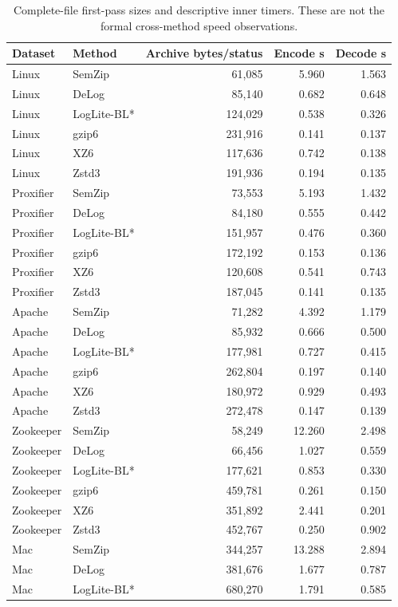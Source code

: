 \begin{longtable}{llrrr}
\caption{Complete-file first-pass sizes and descriptive inner timers. These are not the formal cross-method speed observations.}\\
\toprule
Dataset & Method & Archive bytes/status & Encode s & Decode s \\ \midrule\endhead
Linux & SemZip & 61,085 & 5.960 & 1.563 \\
Linux & DeLog & 85,140 & 0.682 & 0.648 \\
Linux & LogLite-BL* & 124,029 & 0.538 & 0.326 \\
Linux & gzip6 & 231,916 & 0.141 & 0.137 \\
Linux & XZ6 & 117,636 & 0.742 & 0.138 \\
Linux & Zstd3 & 191,936 & 0.194 & 0.135 \\
Proxifier & SemZip & 73,553 & 5.193 & 1.432 \\
Proxifier & DeLog & 84,180 & 0.555 & 0.442 \\
Proxifier & LogLite-BL* & 151,957 & 0.476 & 0.360 \\
Proxifier & gzip6 & 172,192 & 0.153 & 0.136 \\
Proxifier & XZ6 & 120,608 & 0.541 & 0.743 \\
Proxifier & Zstd3 & 187,045 & 0.141 & 0.135 \\
Apache & SemZip & 71,282 & 4.392 & 1.179 \\
Apache & DeLog & 85,932 & 0.666 & 0.500 \\
Apache & LogLite-BL* & 177,981 & 0.727 & 0.415 \\
Apache & gzip6 & 262,804 & 0.197 & 0.140 \\
Apache & XZ6 & 180,972 & 0.929 & 0.493 \\
Apache & Zstd3 & 272,478 & 0.147 & 0.139 \\
Zookeeper & SemZip & 58,249 & 12.260 & 2.498 \\
Zookeeper & DeLog & 66,456 & 1.027 & 0.559 \\
Zookeeper & LogLite-BL* & 177,621 & 0.853 & 0.330 \\
Zookeeper & gzip6 & 459,781 & 0.261 & 0.150 \\
Zookeeper & XZ6 & 351,892 & 2.441 & 0.201 \\
Zookeeper & Zstd3 & 452,767 & 0.250 & 0.902 \\
Mac & SemZip & 344,257 & 13.288 & 2.894 \\
Mac & DeLog & 381,676 & 1.677 & 0.787 \\
Mac & LogLite-BL* & 680,270 & 1.791 & 0.585 \\

\end{longtable}

